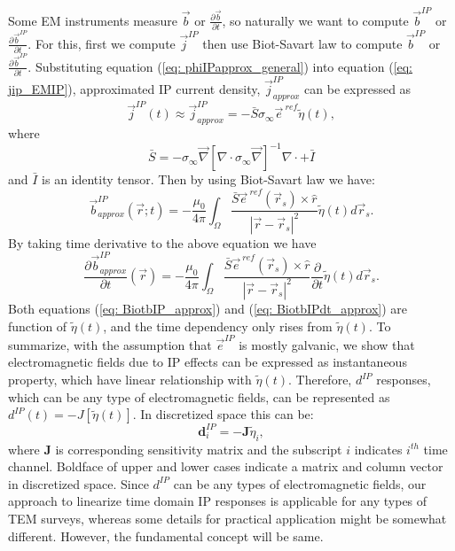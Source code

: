 \documentclass[a4paper, 11pt]{article}
\renewcommand{\div}{\nabla\cdot}
\newcommand{\grad}{\vec \nabla}
\newcommand{\siginf}{\sigma_\infty}
\renewcommand {\j}  { {\vec j} }
\renewcommand {\b}  { {\vec b} }
\newcommand {\e}  { {\vec e} }
\newcommand{\peta}{\tilde{\eta}}
\newcommand{\dip}{d^{IP}}
\begin{document}
Some EM instruments measure $\b$ or $\frac{\partial \b}{\partial t}$, so naturally we want to compute $\b^{IP}$ or $\frac{\partial \b^{IP}}{\partial t}$. For this, first we compute $\j^{IP}$ then use Biot-Savart law to compute $\b^{IP}$ or $\frac{\partial \b^{IP}}{\partial t}$. Substituting equation (\ref{eq: phiIPapprox_general}) into equation (\ref{eq: jip_EMIP}), approximated IP current density, $\j^{IP}_{approx}$ can be expressed as
\begin{equation}
  \j^{IP}(t) \approx \j^{IP}_{approx} = -\bar{S}\siginf\e^{\ ref}\peta(t),
  \label{eq: jip_approx}
\end{equation}
where
\begin{equation}
  \bar{S} = -\siginf\grad[\div \siginf\grad]^{-1}\div+\bar{I}
\end{equation}
and $\bar{I}$ is an identity tensor. Then by using Biot-Savart law we have:
\begin{equation}
  \b^{IP}_{approx}(\vec{r}; t) = -\frac{\mu_0}{4\pi}\int_{\Omega}  \frac{\bar{S}\e^{\ ref}(\vec{r}_s)\times\hat{r}}{|\vec{r}-\vec{r}_s|^2}\peta(t)d\vec{r}_s.
  \label{eq: BiotbIP_approx}
\end{equation}
By taking time derivative to the above equation we have
\begin{equation}
  \frac{\partial\b^{IP}_{approx}}{\partial t}(\vec{r}) = -\frac{\mu_0}{4\pi} \int_{\Omega}  \frac{\bar{S}\e^{\ ref}(\vec{r}_s)\times\hat{r}}{|\vec{r}-\vec{r}_s|^2}\frac{\partial}{\partial t}\peta(t)d\vec{r}_s.
  \label{eq: BiotbIPdt_approx}
\end{equation}
Both equations (\ref{eq: BiotbIP_approx}) and (\ref{eq: BiotbIPdt_approx}) are function of $\peta(t)$, and the time dependency only rises from $\peta(t)$. 
To summarize, with the assumption that $\e^{IP}$ is mostly galvanic, we show that electromagnetic fields due to IP effects can be expressed as instantaneous property, which have linear relationship with $\peta(t)$. Therefore, $d^{IP}$ responses, which can be any type of electromagnetic fields, can be represented as $\dip(t) = -J[\peta(t)]$. In discretized space this can be:
\begin{equation}
  \mathbf{d}^{IP}_i = -\mathbf{J}\peta_i,
  \label{eq: dIP_lineareq}
\end{equation}
where $\mathbf{J}$ is corresponding sensitivity matrix and the subscript $i$ indicates $i^{th}$ time channel. Boldface of upper and lower cases indicate a matrix and column vector in discretized space. Since $d^{IP}$ can be any types of electromagnetic fields, our approach to linearize time domain IP responses is applicable for any types of TEM surveys, whereas some details for practical application might be somewhat different. However, the fundamental concept will be same.
\end{document}
